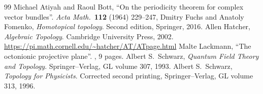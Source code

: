 
\begin{thebibliography}{99}\footnotesize
{}
  Michael Atiyah and Raoul Bott,
  ``On the periodicity theorem for complex vector bundles''.
  \textit{Acta Math.}\ \textbf{112} (1964) 229--247, 
  Dmitry Fuchs and Anatoly Fomenko,
  \textit{Homotopical topology}.
  Second edition, Springer, 2016.
  Allen Hatcher,
  \textit{Algebraic Topology}.
  Cambridge University Press, 2002.
  \url{https://pi.math.cornell.edu/~hatcher/AT/ATpage.html}
  Malte Lackmann,
  ``The octonionic projective plane''.
  , 9 pages.
  Albert S.~Schwarz,
  \textit{Quantum Field Theory and Topology}.
  Springer--Verlag, GL volume 307, 1993.
  Albert S.~Schwarz,
  \textit{Topology for Physicists}.
  Corrected second printing, Springer--Verlag, GL volume 313, 1996.
\end{thebibliography}